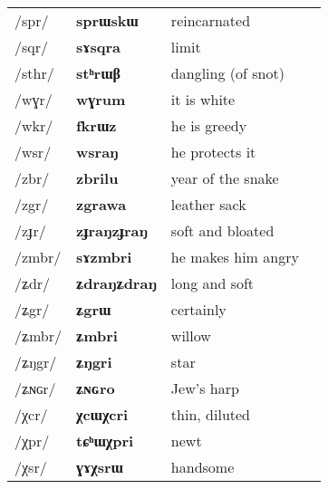 \documentclass[oneside,a4paper,11pt]{article}
\newcommand{\ipa}[1]{{\phon\mbox{\textbf{#1}}}}
\newcommand{\trois}[1]{/#1/}
\newcommand{\tib}[1]{\cellcolor{lightgray}\textbf{#1}}
\newcommand{\idph}[1]{\cellcolor{gray}\textbf{#1}}
\begin{document}
\begin{table}[H]
\begin{tabular}{llll}
 \trois{spr}    	&   \ipa{sprɯskɯ}    	&    reincarnated \\
 \trois{sqr}    	&   \ipa{sɤsqra}     	&  limit \\
 \trois{sthr}  \idph{}   	&   \ipa{stʰrɯβ}    	&   dangling (of snot)  \\
 \trois{wɣr}    	&  \ipa{wɣrum}    	&  it is white \\
 \trois{wkr}   \tib{}  	&   \ipa{fkrɯz}    	&  he is greedy  \\
 \trois{wsr}    	&  \ipa{wsraŋ}    	&  he protects it \\
 \trois{zbr}  \tib{}   	&   \ipa{zbrilu}    	&   year of the snake  \\
 \trois{zgr} \tib{}   	&   \ipa{zgrawa}      	&  leather sack \\
 \trois{zɟr} \idph{}   	&   \ipa{zɟraŋzɟraŋ}    	&   soft and bloated \\
 \trois{zmbr}    	&   \ipa{sɤzmbri}    	&   he makes him angry \\
 \trois{ʑdr}  \idph{}  	&   \ipa{ʑdraŋʑdraŋ}    	&    long and soft \\
 \trois{ʑgr}    	&   \ipa{ʑgrɯ}    	&  certainly  \\
 \trois{ʑmbr}    	&   \ipa{ʑmbri}    	&   willow \\
 \trois{ʑŋgr}    	&   \ipa{ʑŋgri}    	&  star  \\
 \trois{ʑɴɢr}  	& \ipa{ʑɴɢro}  	&Jew's harp \\
 \trois{χcr} \idph{}   	&   \ipa{χcɯχcri}    	&   thin, diluted  \\
 \trois{χpr}    	&   \ipa{tɕʰɯχpri}    	&   newt \\
 \trois{χsr}    	&   \ipa{ɣɤχsrɯ}    	&   handsome  \\
  \bottomrule
  \end{tabular}  
\end{table}  
\end{document}
